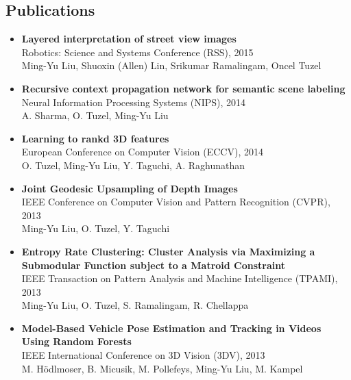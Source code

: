 \documentclass[10pt,letterpaper]{article}
\begin{document}
\subsection*{Publications}
\begin{itemize}
\item           {\bf Layered interpretation of street view images}\\
                Robotics: Science and Systems Conference (RSS), 2015\\
                Ming-Yu Liu, Shuoxin (Allen) Lin, Srikumar Ramalingam, Oncel Tuzel\vspace{-2mm}

\item           {\bf Recursive context propagation network for semantic scene labeling}\\
                Neural Information Processing Systems (NIPS), 2014\\
                A. Sharma, O. Tuzel, {Ming-Yu Liu}\vspace{-2mm}

\item           {\bf Learning to rankd 3D features}\\
                European Conference on Computer Vision (ECCV), 2014\\
                O. Tuzel, {Ming-Yu Liu}, Y. Taguchi, A. Raghunathan\vspace{-2mm}

\item           {\bf Joint Geodesic Upsampling of Depth Images}\\
                IEEE Conference on Computer Vision and Pattern Recognition (CVPR), 2013\\
                {Ming-Yu Liu}, O. Tuzel, Y. Taguchi\vspace{-2mm}

\item           {\bf Entropy Rate Clustering: Cluster Analysis via Maximizing a Submodular Function subject to a Matroid Constraint}\\
                IEEE Transaction on Pattern Analysis and Machine Intelligence (TPAMI), 2013\\
                {Ming-Yu Liu}, O. Tuzel, S. Ramalingam, R. Chellappa\vspace{-2mm}

\item           {\bf Model-Based Vehicle Pose Estimation and Tracking in Videos Using Random Forests}\\
                IEEE International Conference on 3D Vision (3DV), 2013\\
                M. Hödlmoser, B. Micusik, M. Pollefeys, {Ming-Yu Liu}, M. Kampel\vspace{-2mm}


\end{itemize}
\end{document}
